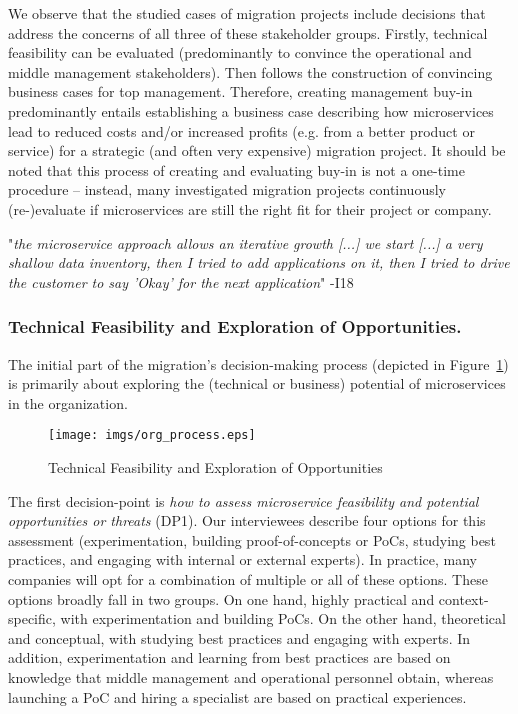 \documentclass[sigconf,dvipsnames]{acmart}
\newcommand{\interviewquote}[2]{
 \def\FrameCommand{%
    \hspace{0pt}%
    {\color{MidnightBlue}\vrule width 1.5pt}%
    {\color{white}\vrule width 4pt}%
    \colorbox{white}
  }%
  \MakeFramed{\advance\hsize-\width\FrameRestore}%
  \noindent\hspace{-4.55pt}%
  \footnotesize{"\emph{#1}" -{#2}}\vspace{0.5pt}\endMakeFramed%
}
\begin{document}
We observe that the studied cases of migration projects include decisions that address the concerns of all three of these stakeholder groups. Firstly, technical feasibility can be evaluated (predominantly to convince the operational and middle management stakeholders). Then follows the construction of convincing business cases for top management.
Therefore, creating management buy-in predominantly entails establishing a business case describing how microservices lead to reduced costs and/or increased profits (e.g. from a better product or service) for a strategic (and often very expensive) migration project. It should be noted that this process of creating and evaluating buy-in is not a one-time procedure -- instead, many investigated migration projects continuously (re-)evaluate if microservices are still the right fit for their project or company.
\interviewquote{the microservice approach allows an iterative growth [...] we start [...] a very shallow data inventory, then I tried to add applications on it, then I tried to drive the customer to say 'Okay' for the next application}{I18}

\subsubsection{Technical Feasibility and Exploration of Opportunities.}
The initial part of the migration's decision-making process (depicted in Figure~\ref{fig:organizational}) is primarily about exploring the (technical or business) potential of microservices in the organization.

\begin{figure}[h!]
  \centering
  \texttt{[image: imgs/org\_process.eps]}
  \caption{Technical Feasibility and Exploration of Opportunities}
  \label{fig:organizational}
\end{figure}

The first decision-point is \emph{how to assess microservice feasibility and potential opportunities or threats} (DP1).
Our interviewees describe four options for this assessment (experimentation, building proof-of-concepts or PoCs, studying best practices, and engaging with internal or external experts). In practice, many companies will opt for a combination of multiple or all of these options.
These options broadly fall in two groups. On one hand, highly practical and context-specific, with experimentation and building PoCs. On the other hand, theoretical and conceptual, with studying best practices and engaging with experts. In addition, experimentation and learning from best practices are based on knowledge that middle management and operational personnel obtain, whereas launching a PoC and hiring a specialist are based on practical experiences.
\end{document}
